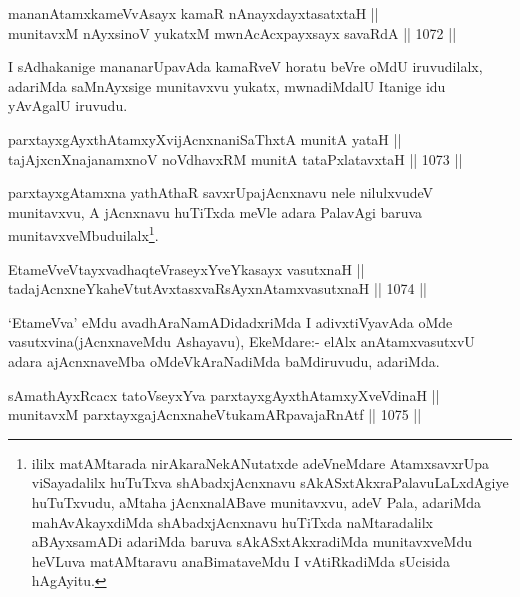 \begin{shl}
mananAtamxkameVvAsayx kamaR nAnayxdayxtasatxtaH || \\
munitavxM nAyxsinoV yukatxM mwnAcAcxpayxsayx savaRdA \hfill || 1072 ||  
\end{shl}

\begin{artha}
I sAdhakanige mananarUpavAda kamaRveV horatu beVre oMdU iruvudilalx, adariMda saMnAyxsige munitavxvu yukatx, mwnadiMdalU Itanige idu yAvAgalU iruvudu.
\end{artha}


\begin{shl}
parxtayxgAyxthAtamxyXvijAcnxnaniSaThxtA munitA yataH || \\
tajAjxcnXnajanamxnoV noVdhavxRM munitA tataPxlatavxtaH \hfill || 1073 ||  
\end{shl}

\begin{artha}
parxtayxgAtamxna yathAthaR savxrUpajAcnxnavu nele nilulxvudeV munitavxvu, A jAcnxnavu huTiTxda meVle adara PalavAgi baruva munitavxveMbuduilalx\footnote{ililx matAMtarada nirAkaraNekANutatxde adeVneMdare AtamxsavxrUpa viSayadalilx huTuTxva shAbadxjAcnxnavu sAkASxtAkxraPalavuLaLxdAgiye huTuTxvudu, aMtaha jAcnxnalABave munitavxvu, adeV Pala, adariMda mahAvAkayxdiMda shAbadxjAcnxnavu huTiTxda naMtaradalilx aBAyxsamADi adariMda baruva sAkASxtAkxradiMda munitavxveMdu heVLuva matAMtaravu anaBimataveMdu I vAtiRkadiMda sUcisida hAgAyitu.}.
\end{artha}

\begin{shl}
EtameVveVtayxvadhaqteVraseyxYveYkasayx vasutxnaH || \\
tadajAcnxneYkaheVtutAvxtasxvaRsAyxnAtamxvasutxnaH \hfill || 1074 ||  
\end{shl}

\begin{artha}
`EtameVva' eMdu avadhAraNamADidadxriMda I adivxtiVyavAda oMde vasutxvina(jAcnxnaveMdu Ashayavu), EkeMdare:- elAlx anAtamxvasutxvU adara ajAcnxnaveMba oMdeVkAraNadiMda baMdiruvudu, adariMda.
\end{artha}

\begin{shl}
sAmathAyxRcacx tatoV\s seyxYva parxtayxgAyxthAtamxyXveVdinaH ||  \\
munitavxM parxtayxgajAcnxnaheVtukamARpavajaRnAtf \hfill || 1075 ||  
\end{shl}


